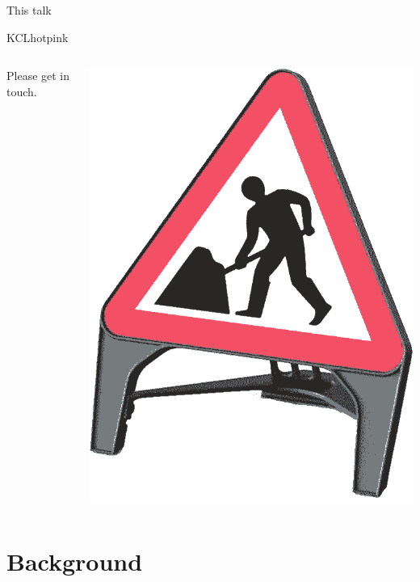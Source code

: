 \documentclass[11pt]{beamer}
\begin{document}
\begin{frame}[t]{This talk}
\begin{cbox}{KCLhotpink}{}
\begin{columns}
\begin{column}[c]{0.6\textwidth}
				Please get in touch.
			\end{column}
			\begin{column}[c]{0.3\textwidth}
				\centering
				\includegraphics[width=\linewidth]{figures/roadwork-sign.png}
			\end{column}
		\end{columns}
	\end{cbox}

\end{frame}

\section{Background}
\end{document}
